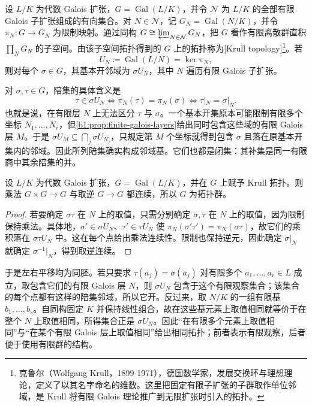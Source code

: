 \begin{samepage}
	\begin{definition}\label{b1:def:krull-topology}
		设 \(L/K\) 为代数 Galois 扩张，\(G=\operatorname{Gal}(L/K)\)，并令 \(\mathcal N\) 为 \(L/K\) 的全部有限 Galois 子扩张组成的有向集合。对 \(N\in\mathcal N\)，记 \(G_N=\operatorname{Gal}(N/K)\)，并令 \(\pi_N:G\rightarrow G_N\) 为限制映射。通过同构 \(G\cong\varprojlim_{N\in\mathcal N}G_N\)，把 \(G\) 看作有限离散群直积 \(\prod_NG_N\) 的子空间。由该子空间拓扑得到的 \(G\) 上的拓扑称为[Krull topology]\footnote{克鲁尔（Wolfgang Krull，1899-1971），德国数学家，发展交换环与理想理论，定义了以其名字命名的维数。这里把固定有限子扩张的子群取作单位邻域，是 Krull 将有限 Galois 理论推广到无限扩张时引入的拓扑。}。若
		\[
			U_N\coloneqq\operatorname{Gal}(L/N)=\ker\pi_N,
		\]
		则对每个 \(\sigma\in G\)，其基本开邻域为 \(\sigma U_N\)，其中 \(N\) 遍历有限 Galois 子扩张。
	\end{definition}
\end{samepage}
对 \(\sigma,\tau\in G\)，陪集的具体含义是
\[
	\tau\in\sigma U_N \iff\pi_N(\tau)=\pi_N(\sigma) \iff\tau|_N=\sigma|_N.
\]
也就是说，在有限层 \(N\) 上无法区分 \(\tau\) 与 \(\sigma\)。一个基本开集原本可能限制有限多个坐标 \(N_1,\ldots,N_r\)，但\cref{b1:prop:finite-galois-layers}给出同时包含这些域的有限 Galois 层 \(M\)。于是 \(\sigma U_M\subseteq\bigcap_j\sigma U_{N_j}\)，只规定第 \(M\) 个坐标就得到包含 \(\sigma\) 且落在原基本开集内的邻域。因此所列陪集确实构成邻域基。它们也都是闭集：其补集是同一有限商中其余陪集的并。

\begin{proposition}\label{b1:prop:krull-group-operations}
	设 \(L/K\) 为代数 Galois 扩张，\(G=\operatorname{Gal}(L/K)\)，并在 \(G\) 上赋予 Krull 拓扑。则乘法 \(G\times G\rightarrow G\) 与取逆 \(G\rightarrow G\) 都连续，所以 \(G\) 为拓扑群。
\end{proposition}
\begin{proof}
	若要确定 \(\sigma\tau\) 在 \(N\) 上的取值，只需分别确定 \(\sigma,\tau\) 在 \(N\) 上的取值，因为限制保持乘法。具体地，\(\sigma'\in\sigma U_N\)、\(\tau'\in\tau U_N\) 使 \(\pi_N(\sigma'\tau')=\pi_N(\sigma\tau)\)，故它们的乘积落在 \(\sigma\tau U_N\) 中。这在每个点给出乘法连续性。限制也保持逆元，因此确定 \(\sigma|_N\) 就确定 \(\sigma^{-1}|_N\)，得到取逆连续。
\end{proof}
于是左右平移均为同胚。若只要求 \(\tau(a_j)=\sigma(a_j)\) 对有限多个 \(a_1,\ldots,a_r\in L\) 成立，取包含它们的有限 Galois 层 \(N\)，则 \(\sigma U_N\) 包含于这个有限观察集合；该集合的每个点都有这样的陪集邻域，所以它开。反过来，取 \(N/K\) 的一组有限基 \(b_1,\ldots,b_s\)。自同构固定 \(K\) 并保持线性组合，故在这些基元素上取值相同就等价于在整个 \(N\) 上取值相同，所得集合正是 \(\sigma U_N\)。因此“在有限多个元素上取值相同”与“在某个有限 Galois 层上取值相同”给出相同拓扑；前者表示有限观察，后者便于使用有限群的结构。


